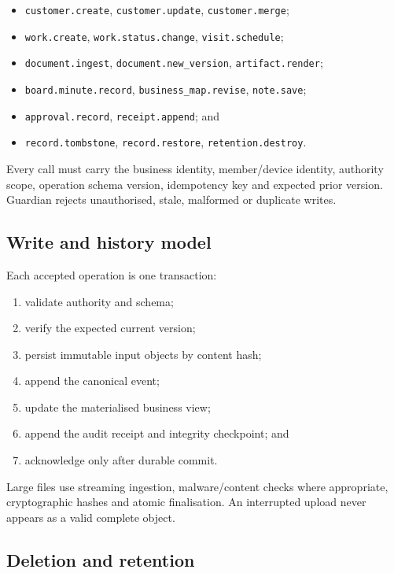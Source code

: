 \documentclass[11pt]{article}
\newcommand{\code}[1]{\texttt{#1}}
\begin{document}
\begin{itemize}
  \item \code{customer.create}, \code{customer.update}, \code{customer.merge};
  \item \code{work.create}, \code{work.status.change}, \code{visit.schedule};
  \item \code{document.ingest}, \code{document.new\_version}, \code{artifact.render};
  \item \code{board.minute.record}, \code{business\_map.revise}, \code{note.save};
  \item \code{approval.record}, \code{receipt.append}; and
  \item \code{record.tombstone}, \code{record.restore}, \code{retention.destroy}.
\end{itemize}

Every call must carry the business identity, member/device identity, authority scope, operation schema version, idempotency key and expected prior version. Guardian rejects unauthorised, stale, malformed or duplicate writes.

\subsection{Write and history model}

Each accepted operation is one transaction:

\begin{enumerate}
  \item validate authority and schema;
  \item verify the expected current version;
  \item persist immutable input objects by content hash;
  \item append the canonical event;
  \item update the materialised business view;
  \item append the audit receipt and integrity checkpoint; and
  \item acknowledge only after durable commit.
\end{enumerate}

Large files use streaming ingestion, malware/content checks where appropriate, cryptographic hashes and atomic finalisation. An interrupted upload never appears as a valid complete object.

\subsection{Deletion and retention}
\end{document}
